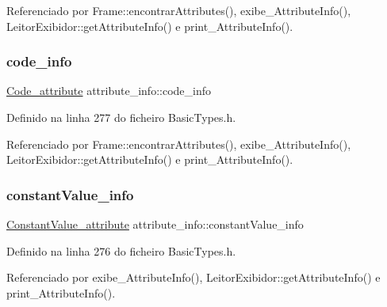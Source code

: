 Referenciado por Frame\+::encontrar\+Attributes(), exibe\+\_\+\+Attribute\+Info(), Leitor\+Exibidor\+::get\+Attribute\+Info() e print\+\_\+\+Attribute\+Info().

\mbox{\label{structattribute__info_a098a24d1810b1a2a1691cbf89199bdc5}} 
\subsubsection{\texorpdfstring{code\+\_\+info}{code\_info}}
{\footnotesize\ttfamily \hyperlink{structCode__attribute}{Code\+\_\+attribute} attribute\+\_\+info\+::code\+\_\+info}



Definido na linha 277 do ficheiro Basic\+Types.\+h.



Referenciado por Frame\+::encontrar\+Attributes(), exibe\+\_\+\+Attribute\+Info(), Leitor\+Exibidor\+::get\+Attribute\+Info() e print\+\_\+\+Attribute\+Info().

\mbox{\label{structattribute__info_ae07b4986ad567ee03d7f5b9476cd2576}} 
\subsubsection{\texorpdfstring{constant\+Value\+\_\+info}{constantValue\_info}}
{\footnotesize\ttfamily \hyperlink{structConstantValue__attribute}{Constant\+Value\+\_\+attribute} attribute\+\_\+info\+::constant\+Value\+\_\+info}



Definido na linha 276 do ficheiro Basic\+Types.\+h.



Referenciado por exibe\+\_\+\+Attribute\+Info(), Leitor\+Exibidor\+::get\+Attribute\+Info() e print\+\_\+\+Attribute\+Info().

\mbox{\label{structattribute__info_a915a26115aeeff5e3d997116f3d671ba}} 
